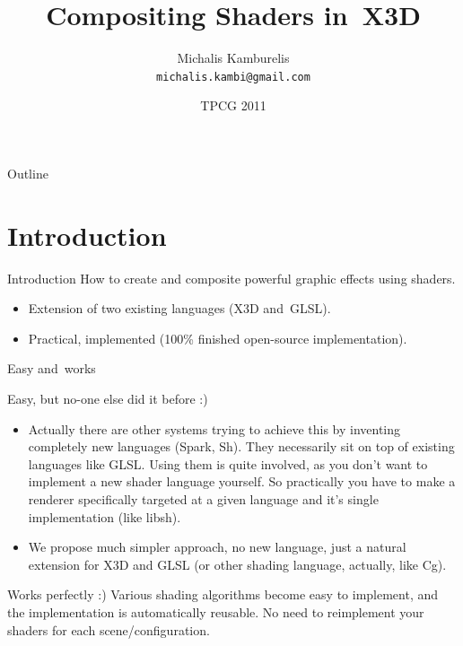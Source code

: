 \documentclass{beamer}
\title{Compositing Shaders in~X3D}
\author[Michalis Kamburelis]{Michalis Kamburelis \\ \texttt{michalis.kambi@gmail.com}}
\institute{Institute of Computer Science\\ University of Wroc{\l}aw, Poland}
\date{TPCG 2011}
\begin{document}
{

  \begin{frame}
    \titlepage
  \end{frame}
}

\begin{frame}{Outline}
  \tableofcontents
\end{frame}

\section{Introduction}

\begin{frame}{Introduction}
How to create and composite powerful graphic effects using shaders.

\begin{itemize}
  \item Extension of two existing languages (X3D and~GLSL).
  \item Practical, implemented (100\% finished open-source
    implementation).
\end{itemize}
\end{frame}

\begin{frame}{Easy and~works}

Easy, but no-one else did it before :)

\begin{itemize}
  \item Actually there are other systems trying to achieve this by inventing
    completely new languages (Spark, Sh). They necessarily sit on top
    of existing languages like GLSL. Using them is quite involved,
    as you don't want to implement a new shader language yourself.
    So practically you have to make a renderer specifically targeted
    at a given language and it's single implementation (like libsh).

  \item  We propose much simpler approach, no new language, just a natural
    extension for X3D and GLSL (or other shading language, actually, like Cg).
\end{itemize}

Works perfectly :) Various shading algorithms become easy to implement,
and the implementation is automatically reusable.
No need to reimplement your shaders for each scene/configuration.


\end{frame}
\end{document}
